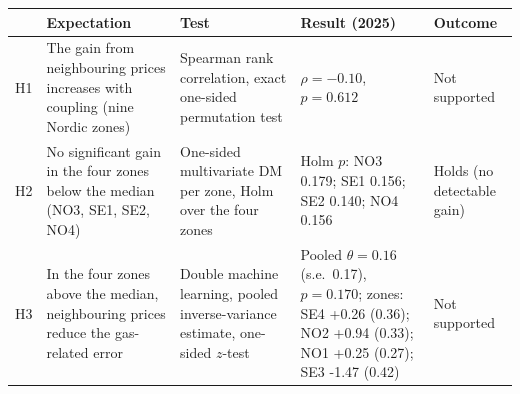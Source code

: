 \begin{tabular}{@{}p{0.6cm}p{3.9cm}p{3.6cm}p{5.2cm}p{2.1cm}@{}}
\toprule
& Expectation & Test & Result (2025) & Outcome \\
\midrule
H1 & The gain from neighbouring prices increases with coupling (nine Nordic zones) & Spearman rank correlation, exact one-sided permutation test & $\rho = -0.10$, $p = 0.612$ & Not supported \\[3pt]
H2 & No significant gain in the four zones below the median (NO3, SE1, SE2, NO4) & One-sided multivariate DM per zone, Holm over the four zones & Holm $p$: NO3 0.179; SE1 0.156; SE2 0.140; NO4 0.156 & Holds (no detectable gain) \\[3pt]
H3 & In the four zones above the median, neighbouring prices reduce the gas-related error & Double machine learning, pooled inverse-variance estimate, one-sided $z$-test & Pooled $\theta = 0.16$ (s.e.\ 0.17), $p = 0.170$; zones: SE4 +0.26 (0.36); NO2 +0.94 (0.33); NO1 +0.25 (0.27); SE3 -1.47 (0.42) & Not supported \\[3pt]
\bottomrule
\end{tabular}
